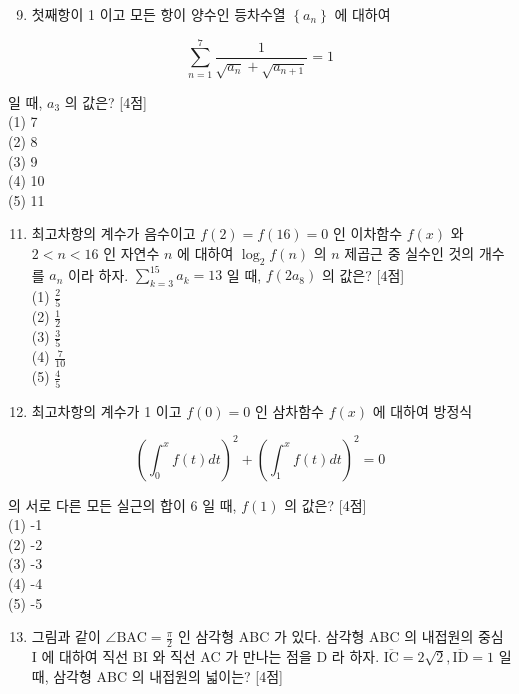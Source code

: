 \documentclass[10pt]{article}
\begin{document}
\begin{enumerate}
  \setcounter{enumi}{8}
  \item 첫째항이 1 이고 모든 항이 양수인 등차수열 \(\left\{a_{n}\right\}\) 에 대하여
\end{enumerate}

\[
\sum_{n=1}^{7} \frac{1}{\sqrt{a_{n}}+\sqrt{a_{n+1}}}=1
\]

일 때, \(a_{3}\) 의 값은? [4점]\\
(1) 7\\
(2) 8\\
(3) 9\\
(4) 10\\
(5) 11

\begin{enumerate}
  \setcounter{enumi}{10}
  \item 최고차항의 계수가 음수이고 \(f(2)=f(16)=0\) 인 이차함수 \(f(x)\) 와 \(2<n<16\) 인 자연수 \(n\) 에 대하여 \(\log _{2} f(n)\) 의 \(n\) 제곱근 중 실수인 것의 개수를 \(a_{n}\) 이라 하자. \(\sum_{k=3}^{15} a_{k}=13\) 일 때, \(f\left(2 a_{8}\right)\) 의 값은? [4점]\\
(1) \(\frac{2}{5}\)\\
(2) \(\frac{1}{2}\)\\
(3) \(\frac{3}{5}\)\\
(4) \(\frac{7}{10}\)\\
(5) \(\frac{4}{5}\)

  \item 최고차항의 계수가 1 이고 \(f(0)=0\) 인 삼차함수 \(f(x)\) 에 대하여 방정식

\end{enumerate}

\[
\left(\int_{0}^{x} f(t) d t\right)^{2}+\left(\int_{1}^{x} f(t) d t\right)^{2}=0
\]

의 서로 다른 모든 실근의 합이 6 일 때, \(f(1)\) 의 값은? [4점]\\
(1) -1\\
(2) -2\\
(3) -3\\
(4) -4\\
(5) -5

\begin{enumerate}
  \setcounter{enumi}{12}
  \item 그림과 같이 \(\angle \mathrm{BAC}=\frac{\pi}{2}\) 인 삼각형 ABC 가 있다. 삼각형 ABC 의 내접원의 중심 I 에 대하여 직선 BI 와 직선 AC 가 만나는 점을 D 라 하자. \(\overline{\mathrm{IC}}=2 \sqrt{2}, \overline{\mathrm{ID}}=1\) 일 때, 삼각형 ABC 의 내접원의 넓이는? [4점]
\end{enumerate}
\end{document}
